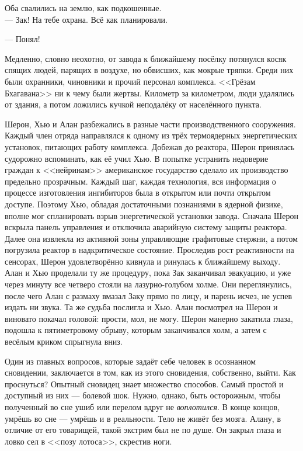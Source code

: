 \documentclass[openany, oneside]{book}
\begin{document}
Оба свалились на землю, как подкошенные.\\

--- Зак! На тебе охрана. Всё как планировали.

--- Понял!

Медленно, словно неохотно, от завода к ближайшему посёлку потянулся косяк спящих людей, парящих в воздухе, но обвисших, как мокрые тряпки. Среди них были охранники, чиновники и прочий персонал комплекса. <<Грёзам Бхагавана>> ни к чему были жертвы. Километр за километром, люди удалялись от здания, а потом ложились кучкой неподалёку от населённого пункта.

Шерон, Хью и Алан разбежались в разные части производственного сооружения. Каждый член отряда направлялся к одному из трёх термоядерных энергетических установок, питающих работу комплекса. Добежав до реактора, Шерон принялась судорожно вспоминать, как её учил Хью. В попытке устранить недоверие граждан к <<нейринам>> американское государство сделало их производство предельно прозрачным. Каждый шаг, каждая технология, вся информация о процессе изготовления ингибиторов была в открытом или почти открытом доступе. Поэтому Хью, обладая достаточными познаниями в ядерной физике, вполне мог спланировать взрыв энергетической установки завода. Сначала Шерон вскрыла панель управления и отключила аварийную систему защиты реактора. Далее она извлекла из активной зоны управляющие графитовые стержни, а потом погрузила реактор в надкритическое состояние. Проследив рост реактивности на сенсорах, Шерон удовлетворённо кивнула и ринулась к ближайшему выходу. Алан и Хью проделали ту же процедуру, пока Зак заканчивал эвакуацию, и уже через минуту все четверо стояли на лазурно-голубом холме. Они переглянулись, после чего Алан с размаху вмазал Заку прямо по лицу, и парень исчез, не успев издать ни звука. Та же судьба послигла и Хью. Алан посмотрел на Шерон и виновато покачал головой: прости, мол, не могу. Шерон манерно закатила глаза, подошла к пятиметровому обрыву, которым заканчивался холм, а затем с весёлым криком спрыгнула вниз.

Один из главных вопросов, которые задаёт себе человек в осознанном сновидении, заключается в том, как из этого сновидения, собственно, выйти. Как проснуться? Опытный сновидец знает множество способов. Самый простой и доступный из них --- болевой шок. Нужно, однако, быть осторожным, чтобы полученный во сне ушиб или перелом вдруг не \textit{воплотился}. В конце концов, умрёшь во сне --- умрёшь и в реальности. Тело не живёт без мозга. Алану, в отличие от его товарищей, такой экстрим был не по душе. Он закрыл глаза и ловко сел в <<позу лотоса>>, скрестив ноги.
\end{document}
